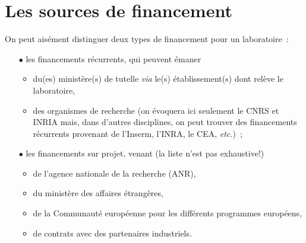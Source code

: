 
\chapter*{Les sources de financement}

On peut ais\'ement distinguer deux types de financement pour un
laboratoire~:

\begin{itemize}
\item[$\bullet$] les financements r\'ecurrents, qui peuvent \'emaner
\begin{itemize}
\item du(es) minist\`ere(s) de tutelle {\em via} le(s)
\'etablissement(s) dont rel\`eve le laboratoire,
\item des organismes de recherche (on \'evoquera ici seulement le CNRS
et INRIA mais, dans d'autres disciplines, on peut trouver des
financements r\'ecurrents provenant de l'Inserm, l'INRA, le CEA, {
{\em etc.}})~;
\end{itemize}
\item[$\bullet$] les financements sur projet, venant (la liste n'est
pas exhaustive!)
\begin{itemize}
\item de l'agence nationale de la recherche (ANR),
\item du minist\`ere des affaires \'etrang\`eres,
\item de la Communaut\'e europ\'eenne pour les diff\'erents programmes europ\'eens,
\item de contrats avec des partenaires industriels.
\end{itemize}
\end{itemize}

